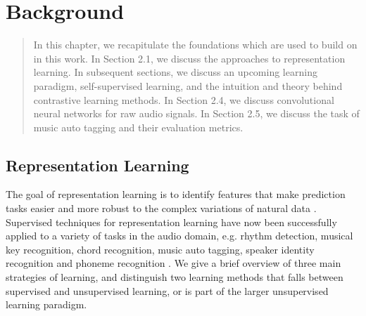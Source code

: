 \chapter{Background}\label{sec:background}
\begin{quote}
    In this chapter, we recapitulate the foundations which are used to build on in this work.
    In Section 2.1, we discuss the approaches to representation learning.
    In subsequent sections, we discuss an upcoming learning paradigm, self-supervised learning, and the intuition and theory behind contrastive learning methods.
    In Section 2.4, we discuss convolutional neural networks for raw audio signals.
    In Section 2.5, we discuss the task of music auto tagging and their evaluation metrics.
\end{quote}


\section{Representation Learning}


The goal of representation learning is to identify features that make  prediction tasks easier and more robust to the complex variations of natural data \cite{bengio2013representation}.
Supervised techniques for representation learning have now been successfully applied to a variety of tasks in the audio domain, e.g. rhythm detection, musical key recognition, chord recognition, music auto tagging, speaker identity recognition and phoneme recognition  \cite{korzeniowski_fully_2016, chen_harmony_2019, korzeniowski_end--end_2017, bock_joint_2016, pons_end--end_2017, van_den_oord_deep_2013}. We give a brief overview of three main strategies of learning, and distinguish two learning methods that falls between supervised and unsupervised learning, or is part of the larger unsupervised learning paradigm.


